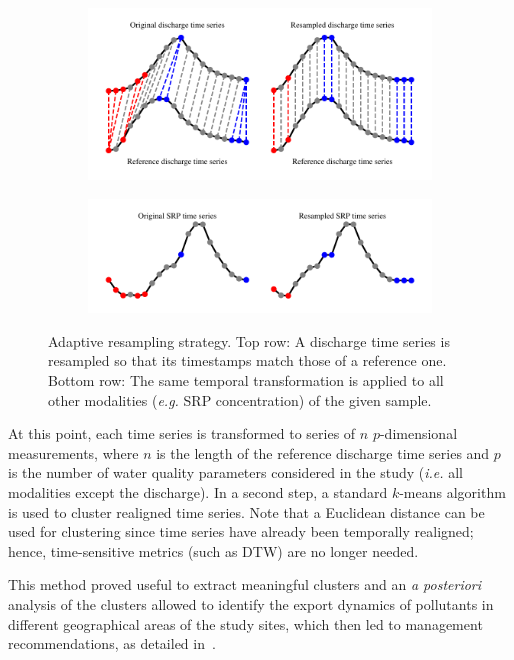 \begin{figure}[t]
    \begin{subfigure}[b]{\textwidth}
         \centering
         \includegraphics[width=.7\textwidth]{fig/dtw_da}
     \end{subfigure}
      \begin{subfigure}[b]{\textwidth}
           \centering
           \includegraphics[width=.7\textwidth]{fig/dtw_da_b}
       \end{subfigure}
    \caption{Adaptive resampling strategy. Top row: A discharge time series is
    resampled so that its timestamps match those of a reference one. Bottom row:
    The same temporal transformation is applied to all other modalities
    (\emph{e.g.} SRP concentration) of the given sample.}
    \label{fig:dtw_da}
\end{figure}

At this point, each time series is transformed to series of $n$
$p$-dimensional measurements, where $n$ is the length of the
reference discharge time series and $p$ is the number of water quality
parameters considered in the study (\emph{i.e.} all modalities except the
discharge).
In a second step, a standard $k$-means algorithm is used to cluster
realigned time series.
Note that a Euclidean distance can be used for clustering since time series
have already been temporally realigned; hence, time-sensitive metrics (such as
DTW) are no longer needed.

This method proved useful to extract meaningful clusters and an \emph{a posteriori}
analysis of the clusters allowed to identify the export dynamics of pollutants
in different geographical areas of the study sites, which then led to management
recommendations, as detailed in~\cite{dupas:halshs-01228397}.
